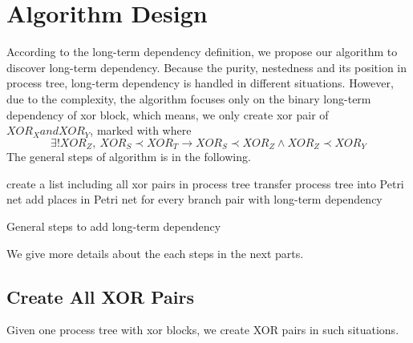 \documentclass[]{article}
\begin{document}
\section{Algorithm Design}
According to the long-term dependency definition, we propose our algorithm to discover long-term dependency. Because the purity, nestedness and its position in process tree, long-term dependency is handled in different situations. However, due to the complexity, the algorithm focuses only on the binary long-term dependency of xor block, which means, we only create xor pair of $XOR_X and XOR_Y$, marked with where 
\[ \exists ! XOR_Z, \: XOR_S \prec XOR_T \rightarrow XOR_S \prec XOR_Z \land XOR_Z \prec XOR_Y \]
The general steps of algorithm is in the following. \\
\begin{algorithm}[H]
	\SetAlgoLined
	create a list including all xor pairs in process tree\;
	transfer process tree into Petri net\;
	add places in Petri net for every branch pair with long-term dependency\;
	\caption{General steps to add long-term dependency}
\end{algorithm}
We give more details about the each steps in the next parts.
\subsection{Create All XOR Pairs}
Given one process tree with xor blocks, we create XOR pairs in such situations. 
\end{document}
